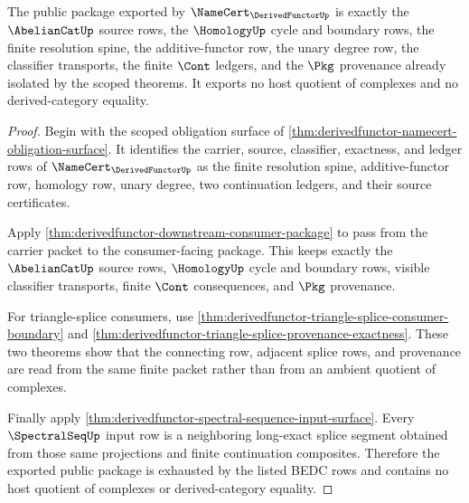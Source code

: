 \begin{theorem}\label{thm:derivedfunctor-public-namecert-package}
The public package exported by $\NameCert_{\DerivedFunctorUp}$ is exactly the
$\AbelianCatUp$ source rows, the $\HomologyUp$ cycle and boundary rows, the
finite resolution spine, the additive-functor row, the unary degree row, the
classifier transports, the finite $\Cont$ ledgers, and the $\Pkg$ provenance
already isolated by the scoped theorems. It exports no host quotient of
complexes and no derived-category equality.
\end{theorem}
\begin{proof}
Begin with the scoped obligation surface of
\autoref{thm:derivedfunctor-namecert-obligation-surface}. It identifies the
carrier, source, classifier, exactness, and ledger rows of
$\NameCert_{\DerivedFunctorUp}$ as the finite resolution spine, additive-functor
row, homology row, unary degree, two continuation ledgers, and their source
certificates.

Apply \autoref{thm:derivedfunctor-downstream-consumer-package} to pass from the
carrier packet to the consumer-facing package. This keeps exactly the
$\AbelianCatUp$ source rows, $\HomologyUp$ cycle and boundary rows, visible
classifier transports, finite $\Cont$ consequences, and $\Pkg$ provenance.

For triangle-splice consumers, use
\autoref{thm:derivedfunctor-triangle-splice-consumer-boundary} and
\autoref{thm:derivedfunctor-triangle-splice-provenance-exactness}. These two
theorems show that the connecting row, adjacent splice rows, and provenance are
read from the same finite packet rather than from an ambient quotient of
complexes.

Finally apply \autoref{thm:derivedfunctor-spectral-sequence-input-surface}.
Every $\SpectralSeqUp$ input row is a neighboring long-exact splice segment
obtained from those same projections and finite continuation composites.
Therefore the exported public package is exhausted by the listed BEDC rows and
contains no host quotient of complexes or derived-category equality.
\end{proof}

